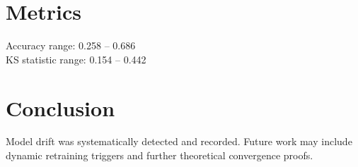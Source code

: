 \documentclass{article}
\begin{document}
\section*{Metrics}
Accuracy range: 0.258 -- 0.686
\\
KS statistic range: 0.154 -- 0.442

\section*{Conclusion}
Model drift was systematically detected and recorded. Future work may include dynamic retraining triggers and further theoretical convergence proofs.
\end{document}
